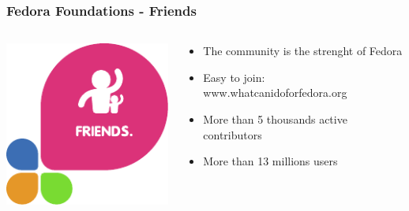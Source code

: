 \documentclass[t,aspectratio=169]{beamer}
\begin{document}
\begin{frame}
    \frametitle{Fedora Foundations - Friends}
    \begin{columns}[T] %
        \begin{column}{.5\textwidth}
            \hfill\includegraphics[height=0.6\textheight]{foundations_expand_2_friends.pdf}
        \end{column}
        \begin{column}{.5\textwidth}
            \begin{itemize}
                \item<2-> The community is the strenght of Fedora
                \item<3-> Easy to join: www.whatcanidoforfedora.org
                \item<4-> More than 5 thousands active contributors
                \item<5-> More than 13 millions users
            \end{itemize}
        \end{column}
    \end{columns}
\end{frame}
\end{document}

